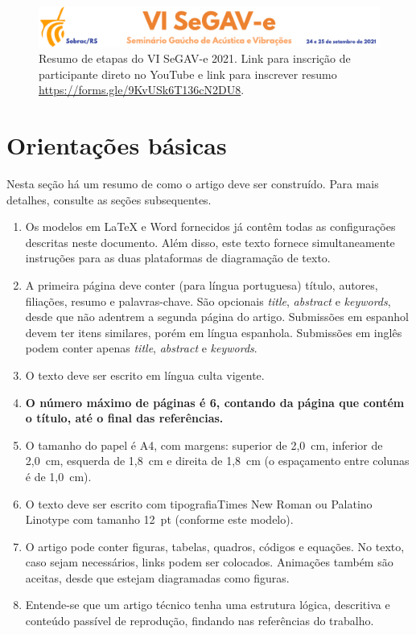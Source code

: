 \begin{figure}[ht!]
	\centering 
        \includegraphics[width=0.98\linewidth,page=3]{segav.pdf}
        \caption{Resumo de etapas do VI SeGAV-e 2021. Link para inscrição de participante direto no YouTube e link para inscrever resumo \url{https://forms.gle/9KvUSk6T136cN2DU8}.}
	\label{fig:reusmao}%
\end{figure}

\section{Orientações básicas}

Nesta seção há um resumo de como o artigo deve ser construído. Para mais detalhes, consulte as seções subsequentes.

\begin{enumerate} \itemsep=2pt
    \item Os modelos em LaTeX e Word fornecidos já contêm todas as configurações descritas neste documento. Além disso, este texto fornece simultaneamente instruções para as duas plataformas de diagramação de texto.
	\item A primeira página deve conter (para língua portuguesa) título, autores, filiações, resumo e palavras-chave. São opcionais \textit{title}, \textit{abstract} e \textit{keywords}, desde que não adentrem a segunda página do artigo.
	Submissões em espanhol devem ter itens similares, porém em língua espanhola. Submissões em inglês podem conter apenas \textit{title}, \textit{abstract} e \textit{keywords}.
	\item O texto deve ser escrito em língua culta vigente.
	\item \textbf{O número máximo de páginas é 6, contando da página que contém o título, até o final das referências.}
	\item O tamanho do papel é A4, com margens: superior de 2,0~cm, inferior de 2,0~cm, esquerda de 1,8~cm e direita de 1,8~cm (o espaçamento entre colunas é de 1,0~cm).
	\item O texto deve ser escrito com tipografia\linebreak Times New Roman ou Palatino Linotype com tamanho 12~pt (conforme este modelo).
	\item O artigo pode conter figuras, tabelas, quadros, códigos e equações. No texto, caso sejam necessários, links podem ser colocados. Animações também são aceitas, desde que estejam diagramadas como figuras.
	\item Entende-se que um artigo técnico tenha uma estrutura lógica, descritiva e conteúdo passível de reprodução, findando nas referências do trabalho.
\end{enumerate}


